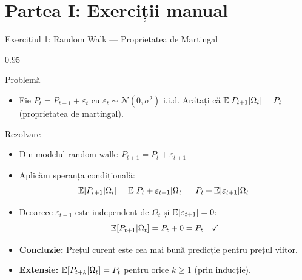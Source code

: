 \documentclass[9pt, aspectratio=169, t]{beamer}
\begin{document}
\section{Partea I: Exerciții manual}

\begin{frame}{Exercițiul 1: Random Walk --- Proprietatea de Martingal}
    \begin{cminipage}{0.95\textwidth}
\begin{block}{Problemă}
\begin{itemize}\setlength{\itemsep}{0pt}
    \item Fie $P_t = P_{t-1} + \varepsilon_t$ cu $\varepsilon_t \sim \mathcal{N}(0, \sigma^2)$ i.i.d. Arătați că $\mathbb{E}[P_{t+1} | \Omega_t] = P_t$ (proprietatea de martingal).
\end{itemize}
\end{block}

\begin{exampleblock}{Rezolvare}
\begin{itemize}\setlength{\itemsep}{0pt}
    \item Din modelul random walk: $P_{t+1} = P_t + \varepsilon_{t+1}$
    \item Aplicăm speranța condițională:
$$\mathbb{E}[P_{t+1} | \Omega_t] = \mathbb{E}[P_t + \varepsilon_{t+1} | \Omega_t] = P_t + \mathbb{E}[\varepsilon_{t+1} | \Omega_t]$$
    \item Deoarece $\varepsilon_{t+1}$ este independent de $\Omega_t$ și $\mathbb{E}[\varepsilon_{t+1}] = 0$:
$$\mathbb{E}[P_{t+1} | \Omega_t] = P_t + 0 = P_t \quad \checkmark$$
    \item \textbf{Concluzie:} Prețul curent este cea mai bună predicție pentru prețul viitor.
    \item \textbf{Extensie:} $\mathbb{E}[P_{t+k} | \Omega_t] = P_t$ pentru orice $k \geq 1$ (prin inducție).
\end{itemize}
\end{exampleblock}
    \end{cminipage}
\end{frame}
\end{document}
